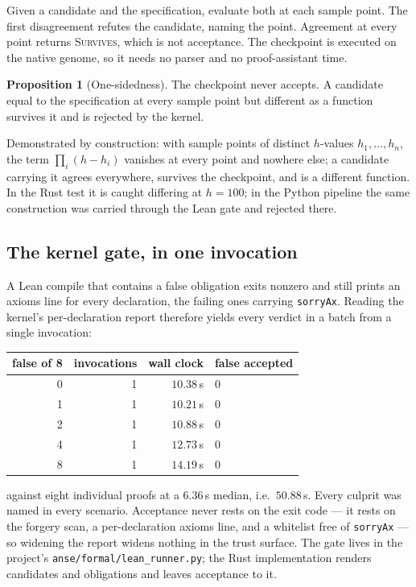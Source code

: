 \documentclass[11pt,a4paper]{article}
\theoremstyle{definition}
\newtheorem{proposition}[theorem]{Proposition}
\theoremstyle{remark}
\begin{document}
Given a candidate and the specification, evaluate both at each sample point. The
first disagreement refutes the candidate, naming the point. Agreement at every
point returns \textsc{Survives}, which is not acceptance. The checkpoint is
executed on the native genome, so it needs no parser and no proof-assistant time.

\begin{proposition}[One-sidedness]
The checkpoint never accepts. A candidate equal to the specification at every
sample point but different as a function survives it and is rejected by the
kernel.
\end{proposition}

Demonstrated by construction: with sample points of distinct $h$-values
$h_1,\dots,h_n$, the term $\prod_i (h - h_i)$ vanishes at every point and
nowhere else; a candidate carrying it agrees everywhere, survives the checkpoint,
and is a different function. In the Rust test it is caught differing at
$h = 100$; in the Python pipeline the same construction was carried through the
Lean gate and rejected there.

\subsection{The kernel gate, in one invocation}

A Lean compile that contains a false obligation exits nonzero and still prints an
axioms line for every declaration, the failing ones carrying \texttt{sorryAx}.
Reading the kernel's per-declaration report therefore yields every verdict in a
batch from a single invocation:

\begin{center}
\begin{tabular}{rrrl}
\toprule
false of 8 & invocations & wall clock & false accepted \\
\midrule
0 & 1 & $10.38$\,s & 0 \\
1 & 1 & $10.21$\,s & 0 \\
2 & 1 & $10.88$\,s & 0 \\
4 & 1 & $12.73$\,s & 0 \\
8 & 1 & $14.19$\,s & 0 \\
\bottomrule
\end{tabular}
\end{center}

against eight individual proofs at a $6.36$\,s median, i.e.\ $50.88$\,s. Every
culprit was named in every scenario. Acceptance never rests on the exit code ---
it rests on the forgery scan, a per-declaration axioms line, and a whitelist free
of \texttt{sorryAx} --- so widening the report widens nothing in the trust
surface. The gate lives in the project's \texttt{anse/formal/lean\_runner.py};
the Rust implementation renders candidates and obligations and leaves acceptance
to it.
\end{document}
